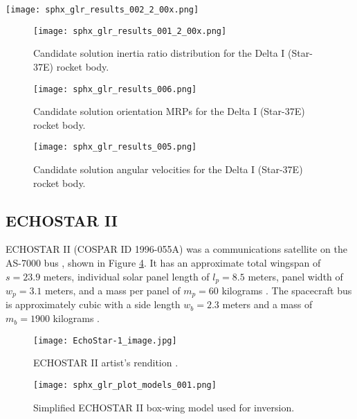 \documentclass[a4paper,twocolumn]{spaceDebrisC} %
\newcommand{\figbig}[0]{0.5\textwidth}
\newcommand{\figmed}[0]{0.4\textwidth}
\begin{document}
\begin{figure*}[t]
  \centering
  \texttt{[image: sphx\_glr\_results\_002\_2\_00x.png]}
  \caption{Candidate solution inertia light curves compared to the real measurements in ADU for the Delta I (Star-37E) rocket body.}
  \label{fig:case2_s}
\end{figure*}

\begin{figure}[H]
  \centering
  \texttt{[image: sphx\_glr\_results\_001\_2\_00x.png]}
  \caption{Candidate solution inertia ratio distribution for the Delta I (Star-37E) rocket body.}
  \label{fig:case2_i}
\end{figure}

\begin{figure}[H]
  \centering
  \texttt{[image: sphx\_glr\_results\_006.png]}
  \caption{Candidate solution orientation MRPs for the Delta I (Star-37E) rocket body.}
  \label{fig:case2_p}
\end{figure}

\begin{figure}[H]
  \centering
  \texttt{[image: sphx\_glr\_results\_005.png]}
  \caption{Candidate solution angular velocities for the Delta I (Star-37E) rocket body.}
  \label{fig:case2_w}
\end{figure}

\subsection{ECHOSTAR II}

ECHOSTAR II (COSPAR ID 1996-055A) was a communications satellite on the AS-7000 bus \cite{as7000_astronautix}, shown in Figure \ref{fig:echostar1}. It has an approximate total wingspan of $s = 23.9$ meters, individual solar panel length of $l_p=8.5$ meters, panel width of $w_p=3.1$ meters, and a mass per panel of $m_p = 60$ kilograms \cite{earl2015}. The spacecraft bus is approximately cubic with a side length $w_b=2.3$ meters and a mass of $m_b = 1900$ kilograms \cite{earl2015}.

\begin{figure}[H]
  \centering
  \texttt{[image: EchoStar-1\_image.jpg]}
  \caption{ECHOSTAR II artist's rendition \cite{as7000_astronautix}.}
  \label{fig:echostar1}
\end{figure}

\begin{figure}[H]
  \centering
  \texttt{[image: sphx\_glr\_plot\_models\_001.png]}
  \caption{Simplified ECHOSTAR II box-wing model used for inversion.}
  \label{fig:echostar1_simple}
\end{figure}
\end{document}
